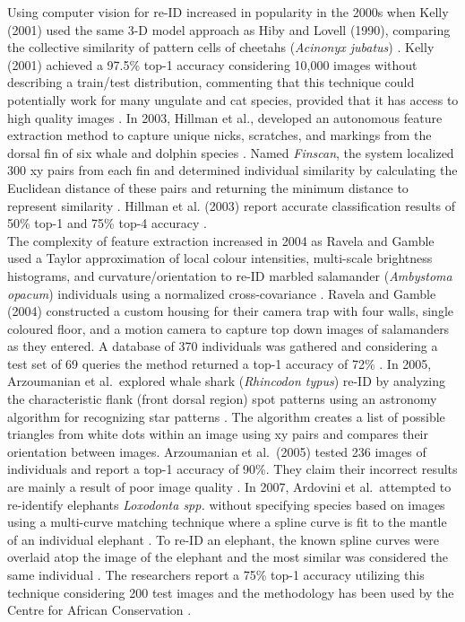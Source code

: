 \documentclass[11pt]{article}
\begin{document}
\noindent
Using computer vision for re-ID increased in popularity in the 2000s when Kelly (2001) used the same 3-D model approach as Hiby and Lovell (1990), comparing the collective similarity of pattern cells of cheetahs (\textit{Acinonyx jubatus}) \cite{kelly2001computer, hiby1990computer}. Kelly (2001) achieved a 97.5\% top-1 accuracy considering 10,000 images without describing a train/test distribution, commenting that this technique could potentially work for many ungulate and cat species, provided that it has access to high quality images \cite{kelly2001computer}. In 2003, Hillman et al., developed an autonomous feature extraction method to capture unique nicks, scratches, and markings from the dorsal fin of six whale and dolphin species \cite{hillman2003computer}. Named \textit{Finscan}, the system localized 300 xy pairs from each fin and determined individual similarity by calculating the Euclidean distance of these pairs and returning the minimum distance to represent similarity \cite{hillman2003computer}. Hillman et al. (2003) report accurate classification results of 50\% top-1 and 75\% top-4 accuracy \cite{hillman2003computer}. 
\newline
\\
The complexity of feature extraction increased in 2004 as Ravela and Gamble used a Taylor approximation of local colour intensities, multi-scale brightness histograms, and curvature/orientation to re-ID marbled salamander (\textit{Ambystoma opacum}) individuals using a normalized cross-covariance \cite{ravela2004recognizing}. Ravela and Gamble (2004) constructed a custom housing for their camera trap with four walls, single coloured floor, and a motion camera to capture top down images of salamanders as they entered. A database of 370 individuals was gathered and considering a test set of 69 queries the method returned a top-1 accuracy of 72\% \cite{ravela2004recognizing}. In 2005, Arzoumanian et al.\ explored whale shark (\textit{Rhincodon typus}) re-ID by analyzing the characteristic flank (front dorsal region) spot patterns using an astronomy algorithm for recognizing star patterns \cite{groth1986pattern, arzoumanian2005astronomical}. The algorithm creates a list of possible triangles from white dots within an image using xy pairs and compares their orientation between images. Arzoumanian et al.\ (2005) tested 236 images of individuals and report a top-1 accuracy of 90\%. They claim their incorrect results are mainly a result of poor image quality \cite{arzoumanian2005astronomical}. In 2007, Ardovini et al.\ attempted to re-identify elephants  \textit{Loxodonta spp.} without specifying species based on images using a multi-curve matching technique where a spline curve is fit to the mantle of an individual elephant \cite{ardovini2008identifying}. To re-ID an elephant, the known spline curves were overlaid atop the image of the elephant and the most similar was considered the same individual \cite{ardovini2008identifying}. The researchers report a 75\% top-1 accuracy utilizing this technique considering 200 test images and the methodology has been used by the Centre for African Conservation \cite{ardovini2008identifying}.
\newline
\end{document}
